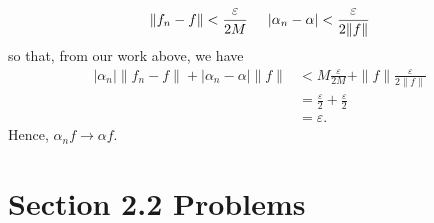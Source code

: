 \documentclass{article}
\begin{document}
\begin{itemize}
    \[\|f_n - f\| < \frac{\varepsilon}{2M} \hspace{0.5cm} |\alpha_n - \alpha| < \frac{\varepsilon}{2\|f\|}\]
    so that, from our work above, we have
    \begin{align*}
        |\alpha_n|\|f_n - f\| + |\alpha_n - \alpha|\|f\| &< M\frac{\varepsilon}{2M} + \|f\|\frac{\varepsilon}{2\|f\|}\\
        &= \frac{\varepsilon}{2} + \frac{\varepsilon}{2}\\
        &= \varepsilon.
    \end{align*}
    Hence, $\alpha_nf \to \alpha f$.
\end{itemize}

\section*{Section 2.2 Problems}
\end{document}
